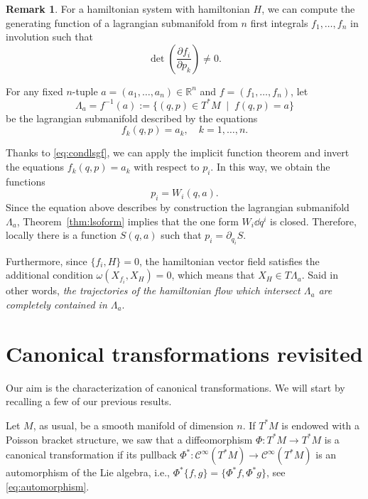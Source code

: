 \documentclass[english,fontsize=11pt,paper=b5]{scrbook}
\theoremstyle{definition}
\newtheorem{remark}{Remark}[chapter]
\begin{document}
    \begin{remark}\label{rmk:nfils}
      For a hamiltonian system with hamiltonian $H$, we can compute the generating function of a lagrangian submanifold from $n$ first integrals $f_1, \ldots, f_n$ in involution such that
      \begin{equation}\label{eq:condlsgf}
        \det\left(\frac{\partial f_i}{\partial p_k}\right) \neq 0.
      \end{equation}

      For any fixed $n$-tuple $a = (a_1, \ldots, a_n) \in \mathbb{R}^n$ and $f=(f_1,\ldots,f_n)$, let
      \begin{equation}
        \Lambda_a = f^{-1}(a) := \{(q,p)\in T^*M \;\mid\; f(q,p) = a\}
      \end{equation}
      be the lagrangian submanifold described by the equations
      \begin{equation}
        f_k(q,p) = a_k, \quad k=1,\ldots,n.
      \end{equation}

      Thanks to \eqref{eq:condlsgf}, we can apply the implicit function theorem and invert the equations $f_k(q,p) = a_k$ with respect to $p_i$. In this way, we obtain the functions
      \begin{equation}
        p_i = W_i(q,a).
      \end{equation}
      Since the equation above describes by construction the lagrangian submanifold $\Lambda_a$, Theorem~\ref{thm:lsoform} implies that the one form $W_i\dd q^i$ is closed.
      Therefore, locally there is a function $S(q, a)$ such that $p_i = \partial_{q_i} S$.

      Furthermore, since $\big\{f_i, H\big\} = 0$, the hamiltonian vector field satisfies the additional condition $\omega(X_{f_i}, X_H) = 0$, which means that $X_H\in T\Lambda_a$. Said in other words, \emph{the trajectories of the hamiltonian flow which intersect $\Lambda_a$ are completely contained in $\Lambda_a$}.
    \end{remark}

    \section{Canonical transformations revisited}

    Our aim is the characterization of canonical transformations.
    We will start by recalling a few of our previous results.

    Let $M$, as usual, be a smooth manifold of dimension $n$.
    If $T^*M$ is endowed with a Poisson bracket structure, we saw that a diffeomorphism $\Phi:T^*M\to T^*M$ is a canonical transformation if its pullback $\Phi^*:\mathcal{C}^\infty(T^*M)\to\mathcal{C}^\infty(T^*M)$ is an automorphism of the Lie algebra, i.e., $\Phi^*\big\{f,g\big\} = \big\{\Phi^* f, \Phi^* g\big\}$, see \eqref{eq:automorphism}.
\end{document}

